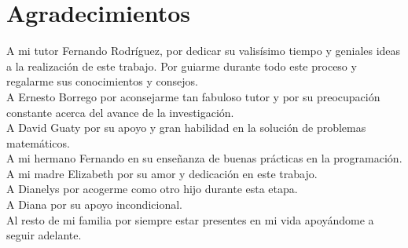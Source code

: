 \chapter*{Agradecimientos}\label{chapter:agradecimientos}

A mi tutor Fernando Rodríguez, por dedicar su valisísimo tiempo y geniales ideas a la realización de este trabajo. Por guiarme durante todo este proceso y regalarme sus conocimientos y consejos.
\\

A Ernesto Borrego por aconsejarme tan fabuloso tutor y por su preocupación constante acerca del avance de la investigación.
\\

A David Guaty por su apoyo y gran habilidad en la solución de problemas matemáticos.
\\

A mi hermano Fernando en su enseñanza de buenas prácticas en la programación.
\\

A mi madre Elizabeth por su amor y dedicación en este trabajo.
\\

A Dianelys por acogerme como otro hijo durante esta etapa.
\\

A Diana por su apoyo incondicional.
\\

Al resto de mi familia por siempre estar presentes en mi vida apoyándome a seguir adelante.
